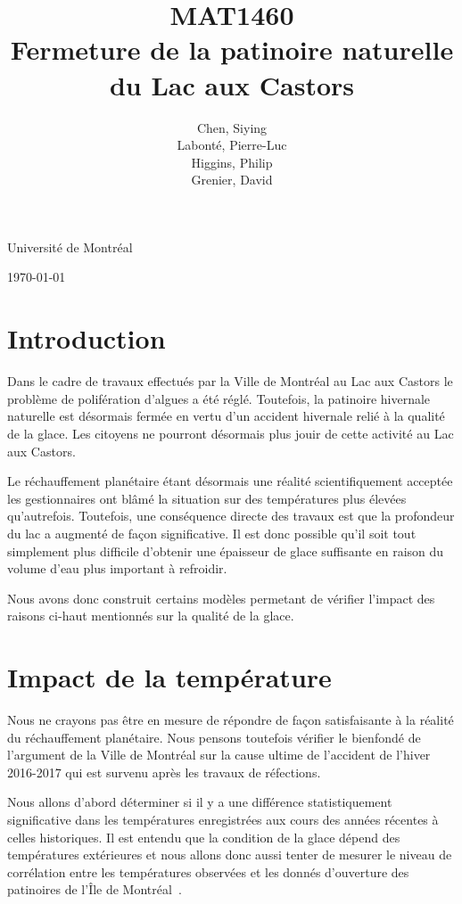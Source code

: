 \documentclass[12pt]{article}
\title{MAT1460\\[3ex]Fermeture de la patinoire naturelle du Lac aux Castors}
\author{Chen, Siying\\[1ex] Labont\'e, Pierre-Luc\\[1ex]Higgins, Philip\\[1ex] Grenier, David}
\date{}
\numberwithin{figure}{section}
\begin{document}
\maketitle
\thispagestyle{empty}
\vfill
\begin{center}
Universit\'e de Montr\'eal

\today
\end{center}
\clearpage

\tableofcontents
\newpage
\section{Introduction}

Dans le cadre de travaux effectu\'es par la Ville de Montr\'eal au Lac aux Castors le probl\`eme de
polif\'eration d'algues a \'et\'e r\'egl\'e. Toutefois, la patinoire hivernale naturelle est
d\'esormais ferm\'ee en vertu d'un accident hivernale reli\'e \`a la qualit\'e de la glace. Les
citoyens ne pourront d\'esormais plus jouir de cette activit\'e au Lac aux Castors.

Le r\'echauffement plan\'etaire \'etant d\'esormais une r\'ealit\'e scientifiquement accept\'ee les
gestionnaires ont bl\^am\'e la situation sur des temp\'eratures plus \'elev\'ees qu'autrefois.
Toutefois, une cons\'equence directe des travaux est que la profondeur du lac a augment\'e de fa\c
con significative. Il est donc possible qu'il soit tout simplement plus difficile d'obtenir une
\'epaisseur de glace suffisante en raison du volume d'eau plus important \`a refroidir.

Nous avons donc construit certains mod\`eles permetant de v\'erifier l'impact des raisons
ci-haut mentionn\'es sur la qualit\'e de la glace.

\section{Impact de la temp\'erature}

Nous ne crayons pas \^etre en mesure de r\'epondre de fa\c con satisfaisante \`a la r\'ealit\'e du
r\'echauffement plan\'etaire. Nous pensons toutefois v\'erifier le bienfond\'e de l'argument de la
Ville de Montr\'eal sur la cause ultime de l'accident de l'hiver 2016-2017 qui est survenu apr\`es
les travaux de r\'efections.

Nous allons d'abord d\'eterminer si il y a une diff\'erence statistiquement significative dans les
temp\'eratures enregistr\'ees aux cours des ann\'ees r\'ecentes \`a celles historiques. Il est
entendu que la condition de la glace d\'epend des temp\'eratures ext\'erieures et nous allons donc
aussi tenter de mesurer le niveau de corr\'elation entre les temp\'eratures observ\'ees et les
donn\'es d'ouverture des patinoires de l'\^Ile de Montr\'eal~\cite{PatHist}.
\end{document}
